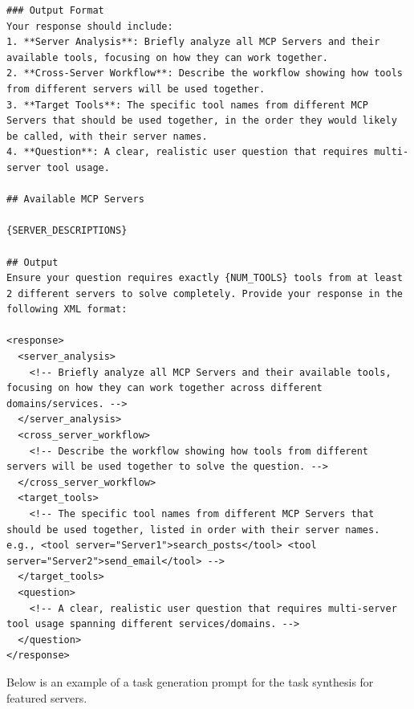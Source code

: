 \begin{verbatim}
### Output Format
Your response should include:
1. **Server Analysis**: Briefly analyze all MCP Servers and their available tools, focusing on how they can work together.
2. **Cross-Server Workflow**: Describe the workflow showing how tools from different servers will be used together.
3. **Target Tools**: The specific tool names from different MCP Servers that should be used together, in the order they would likely be called, with their server names.
4. **Question**: A clear, realistic user question that requires multi-server tool usage.

## Available MCP Servers

{SERVER_DESCRIPTIONS}

## Output
Ensure your question requires exactly {NUM_TOOLS} tools from at least 2 different servers to solve completely. Provide your response in the following XML format:

<response>
  <server_analysis>
    <!-- Briefly analyze all MCP Servers and their available tools, focusing on how they can work together across different domains/services. -->
  </server_analysis>
  <cross_server_workflow>
    <!-- Describe the workflow showing how tools from different servers will be used together to solve the question. -->
  </cross_server_workflow>
  <target_tools>
    <!-- The specific tool names from different MCP Servers that should be used together, listed in order with their server names. e.g., <tool server="Server1">search_posts</tool> <tool server="Server2">send_email</tool> -->
  </target_tools>
  <question>
    <!-- A clear, realistic user question that requires multi-server tool usage spanning different services/domains. -->
  </question>
</response> 
\end{verbatim}

Below is an example of a task generation prompt for the task synthesis for featured servers.

